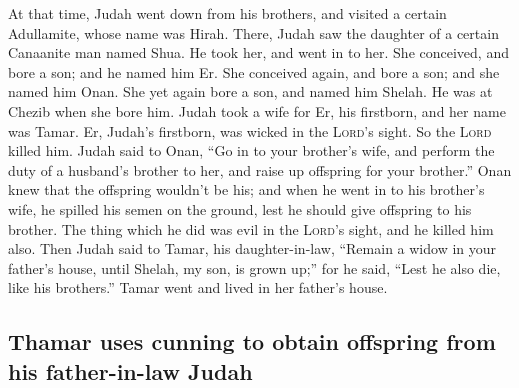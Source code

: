  At that time, Judah went down from his brothers, and
visited a certain Adullamite, whose name was Hirah. 
There, Judah saw the daughter of a certain Canaanite man named Shua. He
took her, and went in to her.  She conceived, and bore a
son; and he named him Er.  She conceived again, and bore a
son; and she named him Onan.  She yet again bore a son,
and named him Shelah. He was at Chezib when she bore him. 
Judah took a wife for Er, his firstborn, and her name was Tamar.
 Er, Judah's firstborn, was wicked in the \textsc{Lord}'s
sight. So the \textsc{Lord} killed him.  Judah said to
Onan, ``Go in to your brother's wife, and perform the duty of a
husband's brother to her, and raise up offspring for your brother.''
 Onan knew that the offspring wouldn't be his; and when he
went in to his brother's wife, he spilled his semen on the ground, lest
he should give offspring to his brother.  The thing which
he did was evil in the \textsc{Lord}'s sight, and he killed him also.
 Then Judah said to Tamar, his daughter-in-law, ``Remain
a widow in your father's house, until Shelah, my son, is grown up;'' for
he said, ``Lest he also die, like his brothers.'' Tamar went and lived
in her father's house.

\hypertarget{thamar-uses-cunning-to-obtain-offspring-from-his-father-in-law-judah}{%
\subsection{Thamar uses cunning to obtain offspring from his
father-in-law
Judah}\label{thamar-uses-cunning-to-obtain-offspring-from-his-father-in-law-judah}}

